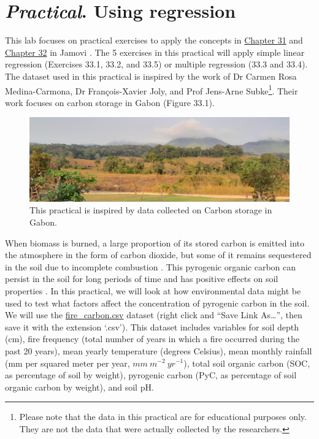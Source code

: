 \documentclass[
]{scrbook}
\begin{document}
\hypertarget{Chapter_33}{%
\chapter{\texorpdfstring{\emph{Practical}. Using regression}{Practical. Using regression}}\label{Chapter_33}}

This lab focuses on practical exercises to apply the concepts in \protect\hyperlink{Chapter_31}{Chapter 31} and \protect\hyperlink{Chapter_32}{Chapter 32} in Jamovi \citep{Jamovi2022}.
The 5 exercises in this practical will apply simple linear regression (Exercises 33.1, 33.2, and 33.5) or multiple regression (33.3 and 33.4).
The dataset used in this practical is inspired by the work of Dr Carmen Rosa Medina-Carmona, Dr François-Xavier Joly, and Prof Jens-Arne Subke\footnote{Please note that the data in this practical are for educational purposes only. They are not the data that were actually collected by the researchers.}.
Their work focuses on carbon storage in Gabon (Figure 33.1).

\begin{figure}
\includegraphics[width=1\linewidth]{img/gabon} \caption{This practical is inspired by data collected on Carbon storage in Gabon.}\label{fig:unnamed-chunk-174}
\end{figure}

When biomass is burned, a large proportion of its stored carbon is emitted into the atmosphere in the form of carbon dioxide, but some of it remains sequestered in the soil due to incomplete combustion \citep{Santin2016}.
This pyrogenic organic carbon can persist in the soil for long periods of time and has positive effects on soil properties \citep{Reisser2016}.
In this practical, we will look at how environmental data might be used to test what factors affect the concentration of pyrogenic carbon in the soil.
We will use the \href{https://raw.githubusercontent.com/bradduthie/SCIU4T4/main/data/fire_carbon.csv}{fire\_carbon.csv} dataset (right click and ``Save Link As\ldots{}'', then save it with the extension `.csv').
This dataset includes variables for soil depth (cm), fire frequency (total number of years in which a fire occurred during the past 20 years), mean yearly temperature (degrees Celsius), mean monthly rainfall (mm per squared meter per year, \(mm\:m^{-2}\:yr^{-1}\)), total soil organic carbon (SOC, as percentage of soil by weight), pyrogenic carbon (PyC, as percentage of soil organic carbon by weight), and soil pH.
\end{document}
